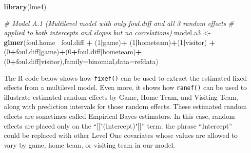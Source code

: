 \documentclass[
]{krantz}
\newenvironment{Shaded}{\begin{snugshade}}{\end{snugshade}}
\newcommand{\CommentTok}[1]{\textcolor[rgb]{0.37,0.37,0.37}{\textit{#1}}}
\newcommand{\DataTypeTok}[1]{\textcolor[rgb]{0.27,0.27,0.27}{#1}}
\newcommand{\DecValTok}[1]{\textcolor[rgb]{0.06,0.06,0.06}{#1}}
\newcommand{\KeywordTok}[1]{\textcolor[rgb]{0.27,0.27,0.27}{\textbf{#1}}}
\newcommand{\NormalTok}[1]{#1}
\newcommand{\OperatorTok}[1]{\textcolor[rgb]{0.43,0.43,0.43}{\textbf{#1}}}
\newcommand{\StringTok}[1]{\textcolor[rgb]{0.5,0.5,0.5}{#1}}
\begin{document}
\begin{Shaded}
\begin{Highlighting}[]
\KeywordTok{library}\NormalTok{(lme4)}

\CommentTok{# Model A.1 (Multilevel model with only foul.diff and all 3 random effects}
\CommentTok{#             applied to both intercepts and slopes but no correlations)}
\NormalTok{model.a3 <-}\StringTok{ }\KeywordTok{glmer}\NormalTok{(foul.home}\OperatorTok{~}\StringTok{ }\NormalTok{foul.diff }\OperatorTok{+}\StringTok{ }\NormalTok{(}\DecValTok{1}\OperatorTok{|}\NormalTok{game)}\OperatorTok{+}
\StringTok{  }\NormalTok{(}\DecValTok{1}\OperatorTok{|}\NormalTok{hometeam)}\OperatorTok{+}\NormalTok{(}\DecValTok{1}\OperatorTok{|}\NormalTok{visitor) }\OperatorTok{+}\StringTok{ }\NormalTok{(}\DecValTok{0}\OperatorTok{+}\NormalTok{foul.diff}\OperatorTok{|}\NormalTok{game)}\OperatorTok{+}\NormalTok{(}\DecValTok{0}\OperatorTok{+}\NormalTok{foul.diff}\OperatorTok{|}\NormalTok{hometeam)}\OperatorTok{+}
\StringTok{  }\NormalTok{(}\DecValTok{0}\OperatorTok{+}\NormalTok{foul.diff}\OperatorTok{|}\NormalTok{visitor),}\DataTypeTok{family=}\NormalTok{binomial,}\DataTypeTok{data=}\NormalTok{refdata)}
\end{Highlighting}
\end{Shaded}

The R code below shows how \texttt{fixef()} can be used to extract the estimated fixed effects from a multilevel model. Even more, it shows how \texttt{ranef()} can be used to illustrate estimated random effects by Game, Home Team, and Visiting Team, along with prediction intervals for those random effects. These estimated random effects are sometimes called Empirical Bayes estimators. In this case, random effects are placed only on the ``{[}{[}"(Intercept)"{]}{]}'' term; the phrase ``Intercept'' could be replaced with other Level One covariates whose values are allowed to vary by game, home team, or visiting team in our model.
\end{document}
